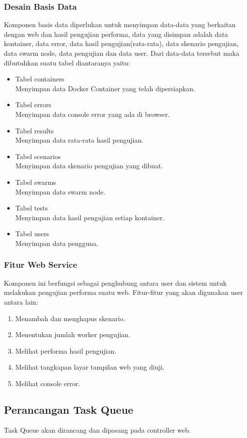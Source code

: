     		\subsubsection{Desain Basis Data}
    			Komponen basis data diperlukan untuk menyimpan data-data yang berkaitan dengan web dan hasil pengujian performa, data yang disimpan adalah data kontainer, data error, data hasil pengujian(rata-rata), data skenario pengujian, data swarm node, data pengujian dan data user. Dari data-data tersebut maka dibutuhkan suatu tabel diantaranya yaitu:
    			\begin{itemize}
    				\item Tabel containers \\
    					Menyimpan data Docker Container yang telah dipersiapkan.
    				\item Tabel errors \\
    					Menyimpan data console error yang ada di browser.
    				\item Tabel results \\
    					Menyimpan data rata-rata hasil pengujian.
    				\item Tabel scenarios \\
    					Menyimpan data skenario pengujian yang dibuat.
    				\item Tabel swarms \\
    					Menyimpan data swarm node.
    				\item Tabel tests \\
    					Menyimpan data hasil pengujian setiap kontainer.
    				\item Tabel users \\
    					Menyimpan data pengguna.
    			\end{itemize}
    			
    		\subsubsection{Fitur Web Service}
    			Komponen ini berfungsi sebagai penghubung antara user dan sistem untuk melakukan pengujian performa suatu web. Fitur-fitur yang akan digunakan user antara lain:
    			\begin{enumerate}
    				\item Menambah dan menghapus skenario.
    				\item Menentukan jumlah worker pengujian.
    				\item Melihat performa hasil pengujian.
    				\item Melihat tangkapan layar tampilan web yang diuji.
    				\item Melihat console error.
    			\end{enumerate}
    		
    	\subsection{Perancangan Task Queue}
    		Task Queue akan dirancang dan dipasang pada controller web.